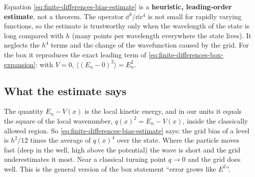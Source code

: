 \begin{pitfall}
Equation \eqref{eq:finite-differences-bias-estimate} is a \textbf{heuristic, leading-order estimate}, not a theorem. The operator $\dd^4/\dd x^4$ is not small for rapidly varying functions, so the estimate is trustworthy only when the wavelength of the state is long compared with $h$ (many points per wavelength everywhere the state lives). It neglects the $h^4$ terms and the change of the wavefunction caused by the grid. For the box it reproduces the exact leading term of \eqref{eq:finite-differences-box-expansion}: with $V=0$, $\langle(E_n-0)^2\rangle=E_n^2$.
\end{pitfall}

\subsection{What the estimate says}

The quantity $E_n-V(x)$ is the local kinetic energy, and in our units it equals the square of the local wavenumber, $q(x)^2=E_n-V(x)$, inside the classically allowed region. So \eqref{eq:finite-differences-bias-estimate} says: the grid bias of a level is $h^2/12$ times the average of $q(x)^4$ over the state. Where the particle moves fast (deep in the well, high above the potential) the wave is short and the grid underestimates it most. Near a classical turning point $q\to0$ and the grid does well. This is the general version of the box statement ``error grows like $E^2$''.

